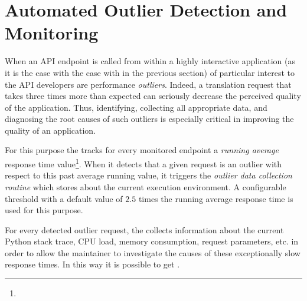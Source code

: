 
  \section{Automated Outlier Detection and Monitoring}
  \label{sec:outliers}
  
  When an API endpoint is called from within a highly interactive application (as it is the case with the case with \epTranslationsColor in the previous section) of particular interest to the API developers are performance {\em outliers}.   Indeed, a translation request that takes three times more than expected can seriously decrease the perceived quality of the application. Thus, identifying, collecting all appropriate data, and diagnosing the root causes of such outliers is especially critical in improving the quality of an application. 
  
  
  For this purpose the \tool tracks for every monitored endpoint a {\em running average} response time value\footnote{}. When it detects that a given request is an outlier with respect to this past average running value, it triggers the {\em outlier data collection routine} which stores  about the current execution environment. A configurable threshold with a default value of $2.5$ times the running average response time is used for this purpose. 

  For every detected outlier request, the \tool collects information about the current Python stack trace, CPU load, memory consumption, request parameters, etc. in order to allow the maintainer to investigate the causes of these exceptionally slow response times. In this way it is possible to get .


